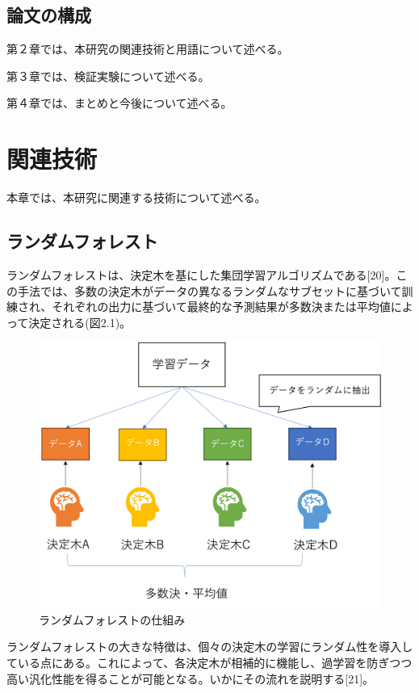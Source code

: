 \documentclass[platex]{suribt}
\begin{document}
\section{論文の構成}
第２章では、本研究の関連技術と用語について述べる。\par
第３章では、検証実験について述べる。\par
第４章では、まとめと今後について述べる。

\chapter{関連技術}
本章では、本研究に関連する技術について述べる。
\section{ランダムフォレスト}
ランダムフォレストは、決定木を基にした集団学習アルゴリズムである[20]。この手法では、多数の決定木がデータの異なるランダムなサブセットに基づいて訓練され、それぞれの出力に基づいて最終的な予測結果が多数決または平均値によって決定される(図2.1)。

\begin{figure}[H]
  \centering
  \includegraphics[scale=0.6]{randomforest.png}
  \caption{ランダムフォレストの仕組み}    \label{randomforest}
\end{figure}
  

ランダムフォレストの大きな特徴は、個々の決定木の学習にランダム性を導入している点にある。これによって、各決定木が相補的に機能し、過学習を防ぎつつ高い汎化性能を得ることが可能となる。いかにその流れを説明する[21]。
\end{document}
